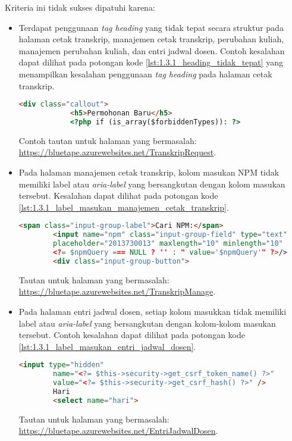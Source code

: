 Kriteria ini tidak sukses dipatuhi karena:
\begin{itemize}
    \item Terdapat penggunaan \textit{tag heading} yang tidak tepat secara struktur pada halaman cetak transkrip, manajemen cetak transkrip, perubahan kuliah, manajemen perubahan kuliah, dan entri jadwal dosen. Contoh kesalahan dapat dilihat pada potongan kode \ref{lst:1.3.1_heading_tidak_tepat} yang menampilkan kesalahan penggunaan \textit{tag heading} pada halaman cetak transkrip.
    \begin{lstlisting}[frame=single, label={lst:1.3.1_heading_tidak_tepat}, language=HTML, caption=Kriteria Sukses 1.3.1 - Penggunaan \textit{Heading} Tidak Tepat]
        <div class="callout">
            <h5>Permohonan Baru</h5>
            <?php if (is_array($forbiddenTypes)): ?>
    \end{lstlisting}
    Contoh tautan untuk halaman yang bermasalah: \url{https://bluetape.azurewebsites.net/TranskripRequest}.

    \item Pada halaman manajemen cetak transkrip, kolom masukan NPM tidak memiliki label atau \textit{aria-label} yang bersangkutan dengan kolom masukan tersebut. Kesalahan dapat dilihat pada potongan kode \ref{lst:1.3.1_label_masukan_manajemen_cetak_transkrip}.
    \begin{lstlisting}[frame=single, label={lst:1.3.1_label_masukan_manajemen_cetak_transkrip}, language=HTML, caption=Kriteria Sukses 1.3.1 - Tidak Terdapat Label pada Kolom Masukan di Halaman Manajemen Cetak Transkrip]
        <span class="input-group-label">Cari NPM:</span>
        <input name="npm" class="input-group-field" type="text"
        placeholder="2013730013" maxlength="10" minlength="10"
        <?= $npmQuery === NULL ? '' : " value='$npmQuery'" ?>/>
        <div class="input-group-button">
    \end{lstlisting}
    Tautan untuk halaman yang bermasalah: \url{https://bluetape.azurewebsites.net/TranskripManage}.

    \item Pada halaman entri jadwal dosen, setiap kolom masukkan tidak memiliki label atau \textit{aria-label} yang bersangkutan dengan kolom-kolom masukan tersebut. Contoh kesalahan dapat dilihat pada potongan kode \ref{lst:1.3.1_label_masukan_entri_jadwal_dosen}.
    \begin{lstlisting}[frame=single, label={lst:1.3.1_label_masukan_entri_jadwal_dosen}, language=HTML, caption=Kriteria Sukses 1.3.1 - Tidak Terdapat Label pada Kolom Masukan di Halaman Entri Jadwal Dosen]
        <input type="hidden" 
        name="<?= $this->security->get_csrf_token_name() ?>"
        value="<?= $this->security->get_csrf_hash() ?>" />
        Hari
        <select name="hari">
    \end{lstlisting}
    Tautan untuk halaman yang bermasalah: \url{https://bluetape.azurewebsites.net/EntriJadwalDosen}.
\end{itemize} 

